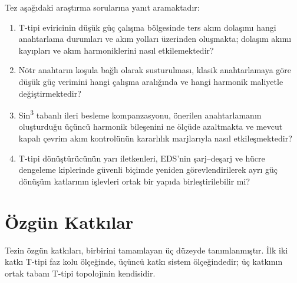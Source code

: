 Tez aşağıdaki araştırma sorularına yanıt aramaktadır:

\begin{enumerate}[label=AS\arabic*.]
  \item T-tipi eviricinin düşük güç çalışma bölgesinde ters akım dolaşımı hangi anahtarlama durumları ve akım yolları üzerinden oluşmakta; dolaşım akımı kayıpları ve akım harmoniklerini nasıl etkilemektedir?
  \item Nötr anahtarın koşula bağlı olarak susturulması, klasik anahtarlamaya göre düşük güç verimini hangi çalışma aralığında ve hangi harmonik maliyetle değiştirmektedir?
  \item Sin\textsuperscript{3} tabanlı ileri besleme kompanzasyonu, önerilen anahtarlamanın oluşturduğu üçüncü harmonik bileşenini ne ölçüde azaltmakta ve mevcut kapalı çevrim akım kontrolünün kararlılık marjlarıyla nasıl etkileşmektedir?
  \item T-tipi dönüştürücünün yarı iletkenleri, EDS'nin şarj--deşarj ve hücre dengeleme kiplerinde güvenli biçimde yeniden görevlendirilerek ayrı güç dönüşüm katlarının işlevleri ortak bir yapıda birleştirilebilir mi?
\end{enumerate}

\section{Özgün Katkılar}
\label{sec:giris-katkilar}

Tezin özgün katkıları, birbirini tamamlayan üç düzeyde tanımlanmıştır. İlk iki katkı T-tipi faz kolu ölçeğinde, üçüncü katkı sistem ölçeğindedir; üç katkının ortak tabanı T-tipi topolojinin kendisidir.

